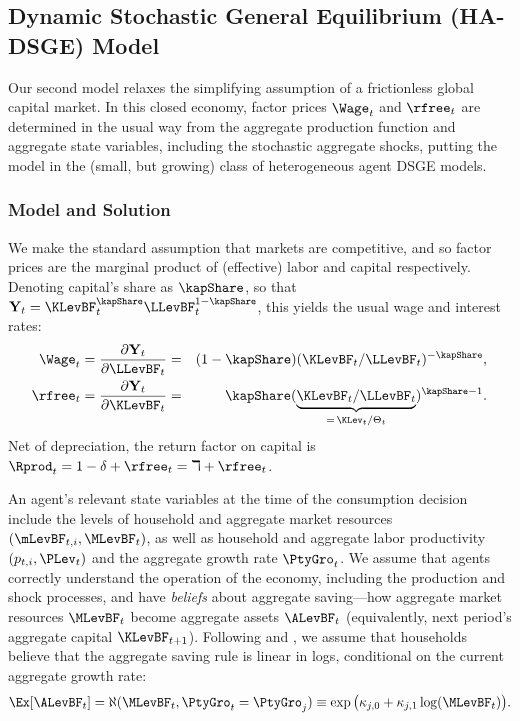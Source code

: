 \documentclass[titlepage]{\econtex}\newcommand{\texname}{cAndCwithStickyE}
\begin{document}
\subsection{Dynamic Stochastic General Equilibrium (HA-DSGE) Model}
\label{sec:HADSGE}

Our second model relaxes the simplifying assumption of a frictionless global capital market.  In this closed economy, factor prices $\Wage_t$ and $\rfree_t$ are determined in the usual way from the aggregate production function and aggregate state variables, including the stochastic aggregate shocks, putting the model in the (small, but growing) class of heterogeneous agent DSGE models.

\subsubsection{Model and Solution}

We make the standard assumption that markets are competitive, and so factor prices are the
marginal product of (effective) labor and capital respectively. Denoting capital's share as $\kapShare$,
so that $\textbf{Y}_t = \KLevBF_t^\kapShare \LLevBF_t^{1-\kapShare}$, this yields the usual wage and interest rates:
\begin{eqnarray}
\Wage_t = \frac{\partial \textbf{Y}_t}{\partial \LLevBF_t} &=& (1-\kapShare) (\KLevBF_t/\LLevBF_t)^{-\kapShare}, \label{eq:MargProd} \\
\rfree_t = \frac{\partial \textbf{Y}_t}{\partial \KLevBF_t} &=& \kapShare (\underbrace{\KLevBF_t/\LLevBF_t}_{=\,\KLev_t/\Theta_t})^{\kapShare-1}. \nonumber
\end{eqnarray}
Net of depreciation, the return factor on capital is $\Rprod_t = 1 -\delta + \rfree_t = \daleth + \rfree_t$.

An agent's relevant state variables at the time of the consumption decision include the levels of household and aggregate market resources $(\mLevBF_{t,i},\MLevBF_t)$, as well as household and aggregate labor productivity $(p_{t,i},\PLev_t)$ and the aggregate growth rate $\PtyGro_t$.  We assume that agents correctly understand the operation of the economy, including the production and shock processes, and have \textit{beliefs} about aggregate saving---how aggregate market resources $\MLevBF_t$ become aggregate assets $\ALevBF_t$ (equivalently, next period's aggregate capital $\KLevBF_{t+1}$).  Following \cite{ksHetero} and \cite{cstwMPC}, we assume that households believe that the aggregate saving rule is linear in logs, conditional on the current aggregate growth rate:
\begin{equation}\label{eq:AggSaving}
\Ex[\ALevBF_t] = \aleph(\MLevBF_t,\PtyGro_t = \PtyGro_j) \equiv \exp\big(\aggrSavingRuleCoeff_{j,0} + \aggrSavingRuleCoeff_{j,1}\log(\MLevBF_t)\big).
\end{equation}
\end{document}
